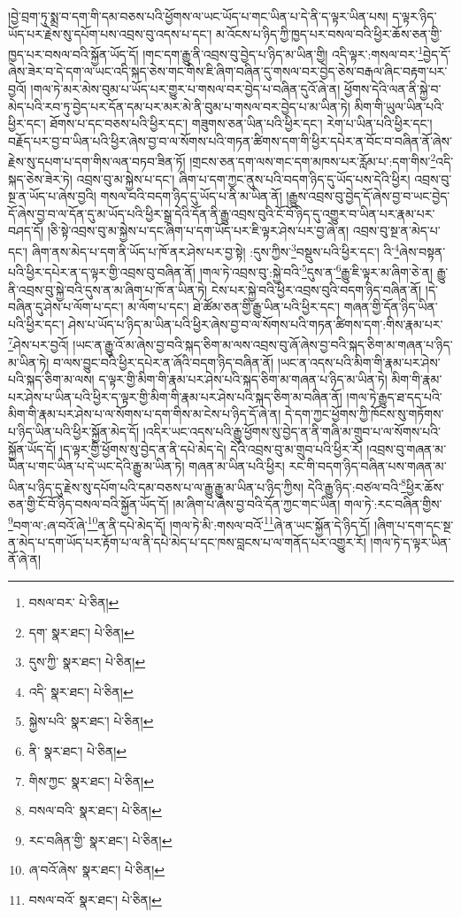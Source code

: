 །བྱེ་བྲག་ཏུ་སྨྲ་བ་དག་གི་དམ་བཅས་པའི་ཕྱོགས་ལ་ཡང་ཡོད་པ་གང་ཡིན་པ་དེ་ནི་ད་ལྟར་ཡིན་པས། ད་ལྟར་ཉིད་ཡོད་པར་རྗེས་སུ་དཔོག་པས་འབྲས་བུ་འདས་པ་དང་། མ་འོངས་པ་ཉིད་ཀྱི་ཁྱད་པར་བསལ་བའི་ཕྱིར་ཆོས་ཅན་གྱི་ཁྱད་པར་བསལ་བའི་སྐྱོན་ཡོད་དོ། །གང་དག་རྒྱུ་ནི་འབྲས་བུ་བྱེད་པ་ཉིད་མ་ཡིན་གྱི། འདི་ལྟར་:གསལ་བར་\footnote{བསལ་བར་  པེ་ཅིན། }བྱེད་དོ་ཞེས་ཟེར་བ་དེ་དག་ལ་ཡང་འདི་སྐད་ཅེས་གང་གིས་ཇི་ཞིག་བཞིན་དུ་གསལ་བར་བྱེད་ཅེས་བརྒལ་ཞིང་བརྟག་པར་བྱའོ། །གལ་ཏེ་མར་མེས་བུམ་པ་ཡོད་པར་གྱུར་པ་གསལ་བར་བྱེད་པ་བཞིན་དུའོ་ཞེ་ན། ཕྱོགས་དེའི་ལན་ནི་སྐྱེ་བ་མེད་པའི་རབ་ཏུ་བྱེད་པར་དོན་དམ་པར་མར་མེ་ནི་བུམ་པ་གསལ་བར་བྱེད་པ་མ་ཡིན་ཏེ། མིག་གི་ཡུལ་ཡིན་པའི་ཕྱིར་དང་། ཐོགས་པ་དང་བཅས་པའི་ཕྱིར་དང་། གཟུགས་ཅན་ཡིན་པའི་ཕྱིར་དང་། རེག་པ་ཡིན་པའི་ཕྱིར་དང་། བརྗོད་པར་བྱ་བ་ཡིན་པའི་ཕྱིར་ཞེས་བྱ་བ་ལ་སོགས་པའི་གཏན་ཚིགས་དག་གི་ཕྱིར་དཔེར་ན་བོང་བ་བཞིན་ནོ་ཞེས་རྗེས་སུ་དཔག་པ་དག་གིས་ལན་བཏབ་ཟིན་ཏོ། །གྲངས་ཅན་དག་ལས་གང་དག་མཁས་པར་རློམ་པ་:དག་གིས་\footnote{དག་  སྣར་ཐང་།  པེ་ཅིན། }འདི་སྐད་ཅེས་ཟེར་ཏེ། འབྲས་བུ་མ་སྐྱེས་པ་དང་། ཞིག་པ་དག་ཀྱང་ནུས་པའི་བདག་ཉིད་དུ་ཡོད་པས་དེའི་ཕྱིར། འབྲས་བུ་སྔ་ན་ཡོད་པ་ཞེས་བྱའི། གསལ་བའི་བདག་ཉིད་དུ་ཡོད་པ་ནི་མ་ཡིན་ནོ། །རྒྱུས་འབྲས་བུ་བྱེད་དོ་ཞེས་བྱ་བ་ཡང་བྱེད་དོ་ཞེས་བྱ་བ་ལ་དོན་དུ་མ་ཡོད་པའི་ཕྱིར་སྒྲ་དེའི་དོན་ནི་རྒྱུ་འབྲས་བུའི་ངོ་བོ་ཉིད་དུ་འགྱུར་བ་ཡིན་པར་རྣམ་པར་བཤད་དོ། །ཅི་སྟེ་འབྲས་བུ་མ་སྐྱེས་པ་དང་ཞིག་པ་དག་ཡོད་པར་ཇི་ལྟར་ཤེས་པར་བྱ་ཞེ་ན། འབྲས་བུ་སྔ་ན་མེད་པ་དང་། ཞིག་ནས་མེད་པ་དག་ནི་ཡོད་པ་ཁོ་ནར་ཤེས་པར་བྱ་སྟེ། :དུས་ཀྱིས་\footnote{དུས་ཀྱི་  སྣར་ཐང་།  པེ་ཅིན། }བསྡུས་པའི་ཕྱིར་དང་། འི་\footnote{འདི་  སྣར་ཐང་།  པེ་ཅིན། }ཞེས་བསྟན་པའི་ཕྱིར་དཔེར་ན་ད་ལྟར་གྱི་འབྲས་བུ་བཞིན་ནོ། །གལ་ཏེ་འབྲས་བུ་:སྐྱེ་བའི་\footnote{སྐྱེས་པའི་  སྣར་ཐང་།  པེ་ཅིན། }དུས་ན་\footnote{ནི་  སྣར་ཐང་།  པེ་ཅིན། }རྒྱུ་ཇི་ལྟར་མ་ཞིག་ཅེ་ན། རྒྱུ་ནི་འབྲས་བུ་སྐྱེ་བའི་དུས་ན་མ་ཞིག་པ་ཁོ་ན་ཡིན་ཏེ། ངེས་པར་སྐྱེ་བའི་ཕྱིར་འབྲས་བུའི་བདག་ཉིད་བཞིན་ནོ། །དེ་བཞིན་དུ་ཤེས་པ་ལོག་པ་དང་། མ་ལོག་པ་དང་། ཐེ་ཚོམ་ཅན་གྱི་རྒྱུ་ཡིན་པའི་ཕྱིར་དང་། གཞན་གྱི་དོན་ཉིད་ཡིན་པའི་ཕྱིར་དང་། ཤེས་པ་ཡོད་པ་ཉིད་མ་ཡིན་པའི་ཕྱིར་ཞེས་བྱ་བ་ལ་སོགས་པའི་གཏན་ཚིགས་དག་:གིས་རྣམ་པར་\footnote{གིས་ཀྱང་  སྣར་ཐང་།  པེ་ཅིན། }ཤེས་པར་བྱའོ། །ཡང་ན་རྒྱུ་འོ་མ་ཞེས་བྱ་བའི་སྐད་ཅིག་མ་ལས་འབྲས་བུ་ཞོ་ཞེས་བྱ་བའི་སྐད་ཅིག་མ་གཞན་པ་ཉིད་མ་ཡིན་ཏེ། བ་ལས་བྱུང་བའི་ཕྱིར་དཔེར་ན་ཞོའི་བདག་ཉིད་བཞིན་ནོ། །ཡང་ན་འདས་པའི་མིག་གི་རྣམ་པར་ཤེས་པའི་སྐད་ཅིག་མ་ལས། ད་ལྟར་གྱི་མིག་གི་རྣམ་པར་ཤེས་པའི་སྐད་ཅིག་མ་གཞན་པ་ཉིད་མ་ཡིན་ཏེ། མིག་གི་རྣམ་པར་ཤེས་པ་ཡིན་པའི་ཕྱིར་ད་ལྟར་གྱི་མིག་གི་རྣམ་པར་ཤེས་པའི་སྐད་ཅིག་མ་བཞིན་ནོ། །གལ་ཏེ་རྒྱུད་ཐ་དད་པའི་མིག་གི་རྣམ་པར་ཤེས་པ་ལ་སོགས་པ་དག་གིས་མ་ངེས་པ་ཉིད་དོ་ཞེ་ན། དེ་དག་ཀྱང་ཕྱོགས་ཀྱི་ཁོངས་སུ་གཏོགས་པ་ཉིད་ཡིན་པའི་ཕྱིར་སྐྱོན་མེད་དོ། །འདིར་ཡང་འདས་པའི་རྒྱུ་ཕྱོགས་སུ་བྱེད་ན་ནི་གཞི་མ་གྲུབ་པ་ལ་སོགས་པའི་སྐྱོན་ཡོད་དོ། །ད་ལྟར་གྱི་ཕྱོགས་སུ་བྱེད་ན་ནི་དཔེ་མེད་དེ། དེའི་འབྲས་བུ་མ་གྲུབ་པའི་ཕྱིར་རོ། །འབྲས་བུ་གཞན་མ་ཡིན་པ་གང་ཡིན་པ་དེ་ཡང་དེའི་རྒྱུ་མ་ཡིན་ཏེ། གཞན་མ་ཡིན་པའི་ཕྱིར། རང་གི་བདག་ཉིད་བཞིན་པས་གཞན་མ་ཡིན་པ་ཉིད་དུ་རྗེས་སུ་དཔོག་པའི་དམ་བཅས་པ་ལ་རྒྱུ་རྒྱུ་མ་ཡིན་པ་ཉིད་ཀྱིས། དེའི་རྒྱུ་ཉིད་:བཙལ་བའི་\footnote{བསལ་བའི་  སྣར་ཐང་།  པེ་ཅིན། }ཕྱིར་ཆོས་ཅན་གྱི་ངོ་བོ་ཉིད་བསལ་བའི་སྐྱོན་ཡོད་དོ། །མ་ཞིག་པ་ཞེས་བྱ་བའི་དོན་ཀྱང་གང་ཡིན། གལ་ཏེ་:རང་བཞིན་གྱིས་\footnote{རང་བཞིན་གྱི་  སྣར་ཐང་།  པེ་ཅིན། }བག་ལ་:ཞ་བའོ་ཞེ་\footnote{ཞ་བའོ་ཞེས་  སྣར་ཐང་།  པེ་ཅིན། }ན་ནི་དཔེ་མེད་དོ། །གལ་ཏེ་མི་:གསལ་བའོ་\footnote{བསལ་བའོ་  སྣར་ཐང་།  པེ་ཅིན། }ཞེ་ན་ཡང་སྐྱོན་དེ་ཉིད་དོ། །ཞིག་པ་དག་དང་སྔ་ན་མེད་པ་དག་ཡོད་པར་རྟོག་པ་ལ་ནི་དཔེ་མེད་པ་དང་ཁས་བླངས་པ་ལ་གནོད་པར་འགྱུར་རོ། །གལ་ཏེ་ད་ལྟར་ཡིན་ནོ་ཞེ་ན། 